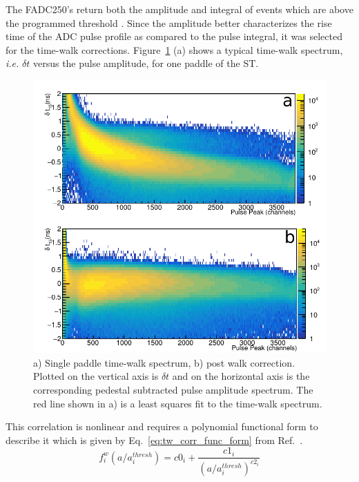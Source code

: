The FADC250's return both the amplitude and integral of events which are above the programmed threshold \cite{dong_fadc}.  Since the amplitude better characterizes the rise time of the ADC pulse profile as compared to the pulse integral, it was selected for the time-walk corrections.  Figure~\ref{fig:time_walk} (a) shows a typical time-walk spectrum, \textit{i.e.} $\delta t$ versus the pulse amplitude, for one paddle of the ST.
	\begin{figure}[!htb]
		\centering
		\includegraphics[width=1.0\columnwidth]{calibration/figs/NIM_TW.pdf}
		\caption{a) Single paddle time-walk spectrum, b) post walk correction.  Plotted on the vertical axis is $\delta t$ and on the horizontal axis is the corresponding pedestal subtracted pulse amplitude spectrum.  The red line shown in a) is a least squares fit to the time-walk spectrum.}
		\label{fig:time_walk}
	\end{figure}
This correlation is nonlinear and requires a polynomial functional form to describe it which is given by Eq.~\ref{eq:tw_corr_func_form} from Ref.~\cite{esmith_bcal}.
	\begin{equation} \label{eq:tw_corr_func_form}
		f^{w}_{i}\left(a/a^{thresh}_{i}\right) = c0_{i} + \frac{c1_{i}}{(a/a^{thresh}_{i})^{c2_{i}}}
	\end{equation}

